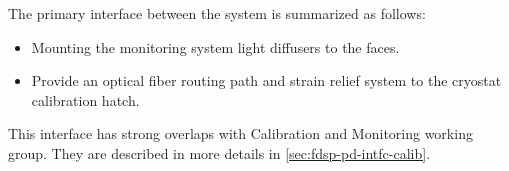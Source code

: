



The primary interface between the  system is summarized as follows:
\begin{itemize}
    \item Mounting the  monitoring system light diffusers to the  faces.
    \item Provide an optical fiber routing path and strain relief system to the cryostat calibration hatch.
\end{itemize} 

This interface has strong overlaps with Calibration and Monitoring working group. They are described in more details in \ref{sec:fdsp-pd-intfc-calib}.



